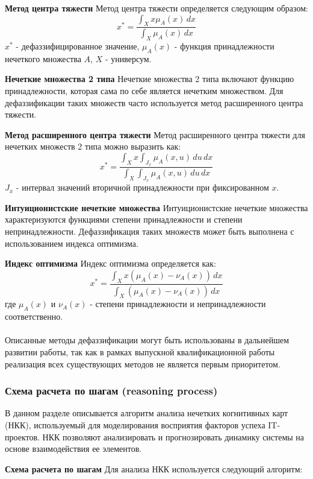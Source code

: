 \documentclass{article}
\begin{document}
    \textbf{Метод центра тяжести}
    Метод центра тяжести определяется следующим образом:
    \[
        x^* = \frac{\int_{X} x \mu_A(x) \, dx}{\int_{X} \mu_A(x) \, dx}
    \]
    $x^*$ - дефаззифицированное значение, $\mu_A(x)$ - функция принадлежности нечеткого множества $A$, $X$ - универсум.

    \textbf{Нечеткие множества 2 типа}
    Нечеткие множества 2 типа включают функцию принадлежности, которая сама по себе является нечетким множеством. Для дефаззификации таких множеств часто используется метод расширенного центра тяжести.

    \textbf{Метод расширенного центра тяжести}
    Метод расширенного центра тяжести для нечетких множеств 2 типа можно выразить как:
    \[
        x^* = \frac{\int_{X} x \int_{J_x} \mu_{A}(x, u) \, du \, dx}{\int_{X} \int_{J_x} \mu_{A}(x, u) \, du \, dx}
    \]
    $J_x$ - интервал значений вторичной принадлежности при фиксированном $x$.

    \textbf{Интуиционистские нечеткие множества}
    Интуиционистские нечеткие множества характеризуются функциями степени принадлежности и степени непринадлежности. Дефаззификация таких множеств может быть выполнена с использованием индекса оптимизма\cite{litlink23}.

    \textbf{Индекс оптимизма}
    Индекс оптимизма определяется как:
    \[
        x^* = \frac{\int_{X} x (\mu_A(x) - \nu_A(x)) \, dx}{\int_{X} (\mu_A(x) - \nu_A(x)) \, dx}
    \]
    где $\mu_A(x)$ и $\nu_A(x)$ - степени принадлежности и непринадлежности соответственно.\\
    ~\\
    Описанные методы дефаззификации могут быть использованы в дальнейшем развитии работы, так как в рамках выпускной квалификационной работы реализация всех существующих методов не является первым приоритетом.
    \subsubsection {Схема расчета по шагам (reasoning process)}
    В данном разделе описывается алгоритм анализа нечетких когнитивных карт (НКК), используемый для моделирования восприятия факторов успеха IT-проектов. НКК позволяют анализировать и прогнозировать динамику системы на основе взаимодействия ее элементов.

    \textbf{Схема расчета по шагам}
    Для анализа НКК используется следующий алгоритм:
\end{document}
